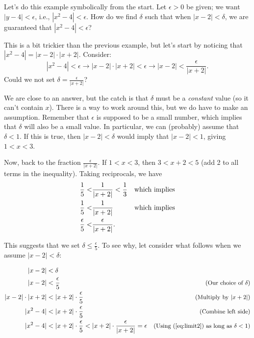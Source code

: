 {Let's do this example symbolically from the start.  Let $\epsilon > 0$ be given; we want $|y-4| < \epsilon$, i.e.,  $|x^2-4| < \epsilon$.  How do we find $\delta$ such that when $|x-2| < \delta$, we are guaranteed that $|x^2-4|<\epsilon$?%

This is a bit trickier than the previous example, but let's start by noticing that 
$|x^2-4| = |x-2|\cdot|x+2|$.  Consider:\\
\begin{equation} |x^2-4| < \epsilon \longrightarrow |x-2|\cdot|x+2| < \epsilon \longrightarrow |x-2| < \frac{\epsilon}{|x+2|}.\label{eq:limit1}\end{equation} 
Could we not set $\displaystyle \delta = \frac{\epsilon}{|x+2|}$?  

We are close to an answer, but the catch is that $\delta$ must be a \textit{constant} value (so it can't contain $x$).  There is a way to work around this, but we do have to make an assumption.  Remember that $\epsilon$ is supposed to be a small number, which implies that $\delta$ will also be a small value.  In particular, we can (probably) assume that $\delta < 1$.  If this is true, then $|x-2| < \delta$ would imply that $|x-2| < 1$, giving $1 < x < 3$.  

Now, back to the fraction $\displaystyle \frac{\epsilon}{|x+2|}$.  If $1<x<3$, then $3<x+2<5$ (add 2 to all terms in the inequality).  Taking reciprocals, we have 
\begin{align}
\frac15 <& \frac1{|x+2|} < \frac 13 & \text{which implies}\notag\\
\frac15 <& \frac1{|x+2|} & \text{which implies}\notag\\
\frac\epsilon5<&\frac{\epsilon}{|x+2|}.\label{eq:limit2}
\end{align}

This suggests that we set 
$\displaystyle \delta \leq \frac{\epsilon}{5}$. To see why, let consider what follows when we assume $|x-2|<\delta$:

\small
\begin{align*}
|x - 2| &< \delta &\\
|x - 2| &< \frac{\epsilon}{5}&  \text{\small(Our choice of $\delta$)}\\
|x - 2|\cdot|x + 2| &< |x + 2|\cdot\frac{\epsilon}{5}&  \text{\small(Multiply by $|x+2|$)}\\
|x^2 - 4|&< |x + 2|\cdot\frac{\epsilon}{5}&  \text{\small(Combine left side)}\\
|x^2 - 4|&< |x + 2|\cdot\frac{\epsilon}{5}< |x + 2|\cdot\frac{\epsilon}{|x+2|}=\epsilon &  
\text{\small(Using (\ref{eq:limit2}) as long as $\delta <1$)}
\end{align*}
\normalsize

}
